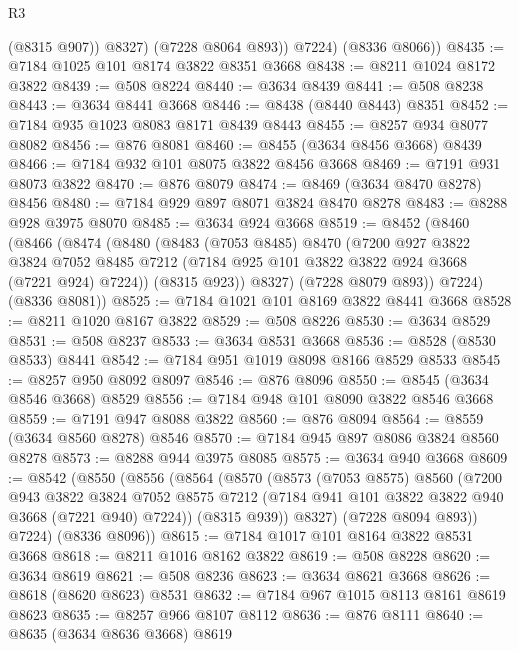 \begin{lexlean}{R3}
\begin{coremodule}
              (@8315 @907))
            @8327)
          (@7228 @8064 @893))
        @7224)
      (@8336 @8066))
@8435 := @7184 @1025 @101 @8174 @3822 @8351 @3668
@8438 := @8211 @1024 @8172 @3822
@8439 := @508 @8224
@8440 := @3634 @8439
@8441 := @508 @8238
@8443 := @3634 @8441 @3668
@8446 := @8438 (@8440 @8443) @8351
@8452 := @7184 @935 @1023 @8083 @8171 @8439 @8443
@8455 := @8257 @934 @8077 @8082
@8456 := @876 @8081
@8460 := @8455 (@3634 @8456 @3668) @8439
@8466 := @7184 @932 @101 @8075 @3822 @8456 @3668
@8469 := @7191 @931 @8073 @3822
@8470 := @876 @8079
@8474 := @8469 (@3634 @8470 @8278) @8456
@8480 := @7184 @929 @897 @8071 @3824 @8470 @8278
@8483 := @8288 @928 @3975 @8070
@8485 := @3634 @924 @3668
@8519 := @8452
    (@8460
      (@8466
        (@8474
          (@8480
            (@8483
              (@7053 @8485)
              @8470
              (@7200
                @927
                @3822
                @3824
                @7052
                @8485
                @7212
                (@7184 @925 @101 @3822 @3822 @924 @3668 (@7221 @924) @7224))
              (@8315 @923))
            @8327)
          (@7228 @8079 @893))
        @7224)
      (@8336 @8081))
@8525 := @7184 @1021 @101 @8169 @3822 @8441 @3668
@8528 := @8211 @1020 @8167 @3822
@8529 := @508 @8226
@8530 := @3634 @8529
@8531 := @508 @8237
@8533 := @3634 @8531 @3668
@8536 := @8528 (@8530 @8533) @8441
@8542 := @7184 @951 @1019 @8098 @8166 @8529 @8533
@8545 := @8257 @950 @8092 @8097
@8546 := @876 @8096
@8550 := @8545 (@3634 @8546 @3668) @8529
@8556 := @7184 @948 @101 @8090 @3822 @8546 @3668
@8559 := @7191 @947 @8088 @3822
@8560 := @876 @8094
@8564 := @8559 (@3634 @8560 @8278) @8546
@8570 := @7184 @945 @897 @8086 @3824 @8560 @8278
@8573 := @8288 @944 @3975 @8085
@8575 := @3634 @940 @3668
@8609 := @8542
    (@8550
      (@8556
        (@8564
          (@8570
            (@8573
              (@7053 @8575)
              @8560
              (@7200
                @943
                @3822
                @3824
                @7052
                @8575
                @7212
                (@7184 @941 @101 @3822 @3822 @940 @3668 (@7221 @940) @7224))
              (@8315 @939))
            @8327)
          (@7228 @8094 @893))
        @7224)
      (@8336 @8096))
@8615 := @7184 @1017 @101 @8164 @3822 @8531 @3668
@8618 := @8211 @1016 @8162 @3822
@8619 := @508 @8228
@8620 := @3634 @8619
@8621 := @508 @8236
@8623 := @3634 @8621 @3668
@8626 := @8618 (@8620 @8623) @8531
@8632 := @7184 @967 @1015 @8113 @8161 @8619 @8623
@8635 := @8257 @966 @8107 @8112
@8636 := @876 @8111
@8640 := @8635 (@3634 @8636 @3668) @8619

\end{coremodule}
\end{lexlean}
